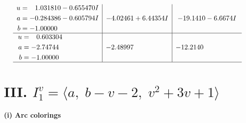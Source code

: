 \documentclass[1p]{elsarticle_modified}
\theoremstyle{definition}
\begin{document}
$$\begin{array}{c|c|c}
\begin{aligned}
u &= \phantom{-}1.031810 - 0.655470 I \\
a &= -0.284386 - 0.605794 I \\
b &= -1.00000\phantom{ +0.000000I}\end{aligned}
 & -4.02461 + 6.44354 I & -19.1410 - 6.6674 I \\ \hline\begin{aligned}
u &= \phantom{-}0.603304\phantom{ +0.000000I} \\
a &= -2.74744\phantom{ +0.000000I} \\
b &= -1.00000\phantom{ +0.000000I}\end{aligned}
 & -2.48997\phantom{ +0.000000I} & -12.2140\phantom{ +0.000000I}\\
 \hline 
 \end{array}$$\newpage\newpage\renewcommand{\arraystretch}{1}
\centering \section*{III. $I^v_{1}= \langle a,\;b- v-2,\;v^2+3 v+1 \rangle$}
\flushleft \textbf{(i) Arc colorings}\\
\end{document}

